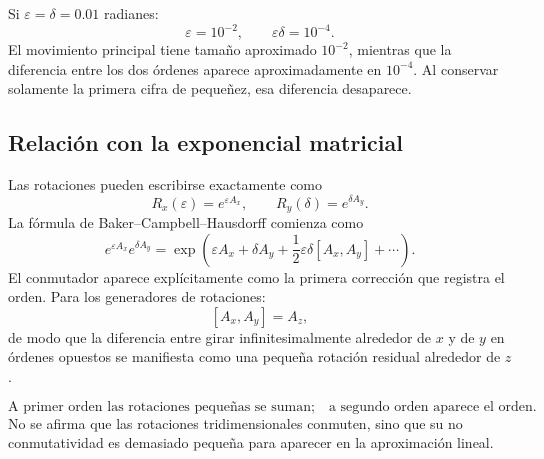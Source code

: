 Si \(\varepsilon=\delta=0.01\) radianes:
\[
\varepsilon=10^{-2},
\qquad
\varepsilon\delta=10^{-4}.
\]
El movimiento principal tiene tamaño aproximado \(10^{-2}\), mientras que la diferencia entre
los dos órdenes aparece aproximadamente en \(10^{-4}\). Al conservar solamente la primera
cifra de pequeñez, esa diferencia desaparece.

\subsection{Relación con la exponencial matricial}

Las rotaciones pueden escribirse exactamente como
\[
  R_x(\varepsilon)=e^{\varepsilon A_x},
  \qquad
  R_y(\delta)=e^{\delta A_y}.
\]
La fórmula de Baker--Campbell--Hausdorff comienza como
\[
e^{\varepsilon A_x}e^{\delta A_y}
=
\exp\left(
\varepsilon A_x+\delta A_y
+\frac12\varepsilon\delta[A_x,A_y]+\cdots
\right).
\]
El conmutador aparece explícitamente como la primera corrección que registra el orden.
Para los generadores de rotaciones:
\[
  [A_x,A_y]=A_z,
\]
de modo que la diferencia entre girar infinitesimalmente alrededor de \(x\) y de \(y\) en
órdenes opuestos se manifiesta como una pequeña rotación residual alrededor de \(z\).

\begin{atencion}
\[
\boxed{
\text{A primer orden las rotaciones pequeñas se suman;}
\quad
\text{a segundo orden aparece el orden.}
}
\]
No se afirma que las rotaciones tridimensionales conmuten, sino que su no conmutatividad es
demasiado pequeña para aparecer en la aproximación lineal.
\end{atencion}

